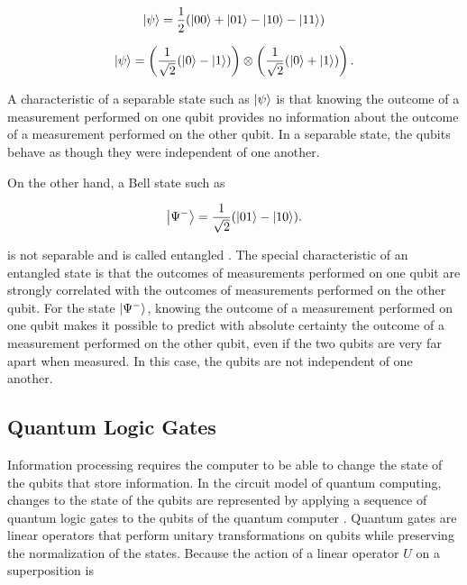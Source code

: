 \begin{center}
\begin{equation}
\ket{\psi} = \frac{1}{2}(\ket{00} + \ket{01} - \ket{10} - \ket{11})   
\end{equation}
\end{center}

\begin{center}
\begin{equation}
\ket{\psi} = \left(\frac{1}{\sqrt{2}}(\ket{0} - \ket{1})\right)\otimes\left(\frac{1}{\sqrt{2}}(\ket{0} + \ket{1})\right).
\end{equation}
\end{center}

A characteristic of a separable state such as $\ket{\psi}$ is that knowing the outcome of a measurement performed on one qubit provides no information about the outcome of a measurement performed on the other qubit. In a separable state, the qubits behave as though they were independent of one another.

On the other hand, a Bell state such as

\begin{center}
\begin{equation}\label{eq:Bell}
\ket{\Psi^-} = \frac{1}{\sqrt{2}}(\ket{01} - \ket{10}). 
\end{equation}
\end{center}

is not separable and is called entangled \cite{Wong2022IntroductionClassicalQuantum}. The special characteristic of an entangled state is that the outcomes of measurements performed on one qubit are strongly correlated with the outcomes of measurements performed on the other qubit. For the state $\ket{\Psi^-}$, knowing the outcome of a measurement performed on one qubit makes it possible to predict with absolute certainty the outcome of a measurement performed on the other qubit, even if the two qubits are very far apart when measured. In this case, the qubits are not independent of one another.

\subsection{Quantum Logic Gates} \label{Portas}

Information processing requires the computer to be able to change the state of the qubits that store information. In the circuit model of quantum computing, changes to the state of the qubits are represented by applying a sequence of quantum logic gates to the qubits of the quantum computer \cite{Nielsen}. Quantum gates are linear operators that perform unitary transformations on qubits while preserving the normalization of the states. Because the action of a linear operator $U$ on a superposition is

